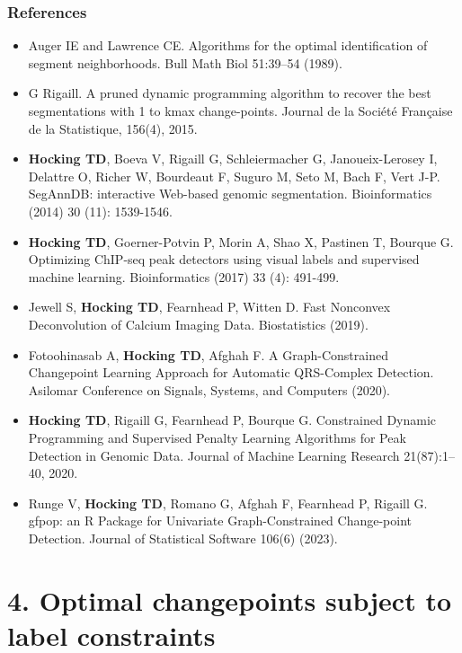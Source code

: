 \documentclass{beamer}
\begin{document}
\begin{frame}
  \frametitle{References}
  \scriptsize
  \begin{itemize}
  \item Auger IE and Lawrence CE. Algorithms for the optimal
    identification of segment neighborhoods. Bull Math Biol 51:39–54
    (1989).
  \item G Rigaill.  A pruned dynamic programming algorithm to recover
    the best segmentations with 1 to kmax change-points. Journal de la
    Société Française de la Statistique, 156(4), 2015. 
  \item \textbf{Hocking TD}, Boeva V, Rigaill G, Schleiermacher G,
    Janoueix-Lerosey I, Delattre O, Richer W, Bourdeaut F, Suguro M,
    Seto M, Bach F, Vert J-P. SegAnnDB: interactive Web-based genomic
    segmentation. Bioinformatics (2014) 30 (11): 1539-1546.
  \item \textbf{Hocking TD}, Goerner-Potvin P, Morin A, Shao X,
    Pastinen T, Bourque G. Optimizing ChIP-seq peak detectors using
    visual labels and supervised machine learning. Bioinformatics
    (2017) 33 (4): 491-499.
  \item Jewell S, \textbf{Hocking TD}, Fearnhead P, Witten D. Fast Nonconvex
    Deconvolution of Calcium Imaging Data. Biostatistics (2019).
  \item Fotoohinasab A, \textbf{Hocking TD}, Afghah F. A
    Graph-Constrained Changepoint Learning Approach for Automatic
    QRS-Complex Detection. Asilomar Conference on Signals, Systems,
    and Computers (2020).
  \item \textbf{Hocking TD}, Rigaill G, Fearnhead P, Bourque G. Constrained
    Dynamic Programming and Supervised Penalty Learning Algorithms for
    Peak Detection in Genomic Data. Journal of Machine Learning
    Research 21(87):1--40, 2020.
  \item Runge V, \textbf{Hocking TD}, Romano G, Afghah F, Fearnhead P, Rigaill
    G. gfpop: an R Package for Univariate Graph-Constrained
    Change-point Detection. Journal of Statistical
    Software 106(6) (2023).
  \end{itemize}
\end{frame}

\section{4. Optimal changepoints subject to label constraints}
\end{document}

